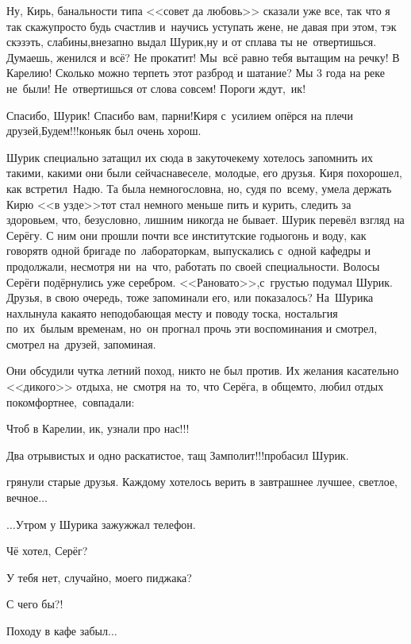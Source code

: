 {\diagdash Ну, Кирь, банальности типа <<совет да любовь>> сказали уже все, так что я так скажу\mdash просто будь счастлив и~научись уступать жене, не давая при этом, тэк скэзэть, слабины,\mdash внезапно выдал Шурик,\mdash ну и от сплава ты не~отвертишься. Думаешь, женился и всё? Не прокатит! Мы~всё равно тебя вытащим на речку! В Карелию! Сколько можно терпеть этот разброд и шатание? Мы 3 года на реке не~были! Не~отвертишься от слова совсем! Пороги ждут,~ик!

\diagdash Спасибо, Шурик! Спасибо вам, парни!\mdash Киря с~усилием опёрся на плечи друзей,\mdash Будем!!!\mdash коньяк был очень хорош.

Шурик специально затащил их сюда в закуточек\mdash ему хотелось запомнить их такими, какими они были сейчас\mdash навеселе, молодые, его друзья. Киря похорошел, как встретил~Надю. Та была немногословна, но, судя по~всему, умела держать Кирю <<в узде>>\mdash тот стал немного меньше пить и курить, следить за здоровьем, что, безусловно, лишним никогда не бывает. Шурик перевёл взгляд на Серёгу. С ним они прошли почти все институтские годы\mdash огонь и воду, как говорят\mdash в одной бригаде по~лабораторкам, выпускались с~одной кафедры и продолжали, несмотря ни~на~что, работать по своей специальности. Волосы Серёги подёрнулись уже серебром. <<Рановато>>,\mdash с~грустью подумал Шурик. Друзья, в свою очередь, тоже запоминали его, или показалось? На~Шурика нахлынула какая\sdash то неподобающая месту и поводу тоска, ностальгия по~их~былым временам, но~он прогнал прочь эти воспоминания и смотрел, смотрел на~друзей, запоминая.  

Они обсудили чутка летний поход, никто не был против. Их желания касательно <<дикого>> отдыха, не~смотря на~то, что Серёга, в общем\sdash то, любил отдых покомфортнее,~совпадали:

\diagdash Чтоб в Карелии, ик, узнали про нас!!!%

\diagdash Два отрывистых и одно раскатистое, тащ Замполит!!!\mdash пробасил Шурик.

\mdash грянули старые друзья. Каждому хотелось верить в завтрашнее лучшее, светлое, вечное$\ldots$

\vspace{2.0cm}
$\ldots$Утром у Шурика зажужжал телефон. 

\diagdash Чё хотел, Серёг?

\diagdash У тебя нет, случайно, моего пиджака?

\diagdash С чего бы?!

\diagdash Походу в кафе забыл$\ldots$

\begin{center}
\end{center}
}
